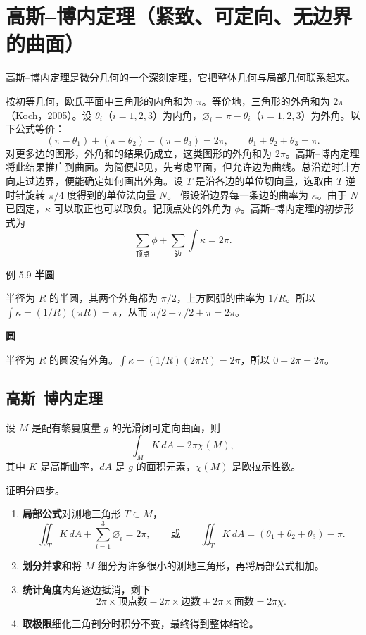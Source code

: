 \section{高斯–博内定理（紧致、可定向、无边界的曲面）}
高斯–博内定理是微分几何的一个深刻定理，它把整体几何与局部几何联系起来。

按初等几何，欧氏平面中三角形的内角和为 $\pi$。等价地，三角形的外角和为 $2\pi$（Koch，2005）。设 $\theta_i$（$i=1,2,3$）为内角，$\varnothing_i=\pi-\theta_i$（$i=1,2,3$）为外角。以下公式等价：
\[
  (\pi-\theta_1)+(\pi-\theta_2)+(\pi-\theta_3)=2\pi,\qquad
  \theta_1+\theta_2+\theta_3=\pi.
\]
对更多边的图形，外角和的结果仍成立，这类图形的外角和为 $2\pi$。高斯–博内定理将此结果推广到曲面。为简便起见，先考虑平面，但允许边为曲线。总沿逆时针方向走过边界，便能确定如何画出外角。设 $T$ 是沿各边的单位切向量，选取由 $T$ 逆时针旋转
$\pi/4$ 度得到的单位法向量 $N$。 假设沿边界每一条边的曲率为 $\kappa$。由于 $N$ 已固定，$\kappa$ 可以取正也可以取负。记顶点处的外角为 $\phi$。高斯–博内定理的初步形式为
\[
  \sum_{\text{顶点}}\phi+\sum_{\text{边}}\int\kappa=2\pi.
\]

\begin{statement}{例 5.9}{}
\textbf{半圆}\par
半径为 $R$ 的半圆，其两个外角都为 $\pi/2$，上方圆弧的曲率为 $1/R$。所以 $\int\kappa=(1/R)(\pi R)=\pi$，从而 $\pi/2+\pi/2+\pi=2\pi$。

\textbf{圆}\par
半径为 $R$ 的圆没有外角。$\int\kappa=(1/R)(2\pi R)=2\pi$，所以 $0+2\pi=2\pi$。
\end{statement}

\subsection{高斯–博内定理}
设 $M$ 是配有黎曼度量 $g$ 的光滑闭可定向曲面，则
\[
  \int_M K\,dA=2\pi\chi(M),
\]
其中 $K$ 是高斯曲率，$dA$ 是 $g$ 的面积元素，$\chi(M)$ 是欧拉示性数。

证明分四步。
\begin{enumerate}
  \item \textbf{局部公式}\quad 对测地三角形 $T\subset M$，
  \[
    \iint_T K\,dA+\sum_{i=1}^3\varnothing_i=2\pi,
    \qquad\text{或}\qquad
    \iint_T K\,dA=(\theta_1+\theta_2+\theta_3)-\pi.
  \]
  \item \textbf{划分并求和}\quad 将 $M$ 细分为许多很小的测地三角形，再将局部公式相加。
  \item \textbf{统计角度}\quad 内角逐边抵消，剩下
  \[
    2\pi\times\text{顶点数}-2\pi\times\text{边数}
    +2\pi\times\text{面数}=2\pi\chi.
  \]
  \item \textbf{取极限}\quad 细化三角剖分时积分不变，最终得到整体结论。
\end{enumerate}

